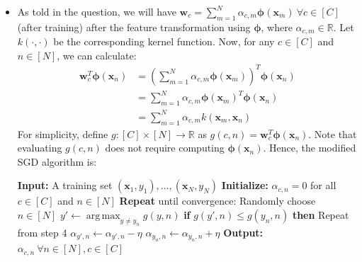 \documentclass{article}
\newcommand{\mbi}[1]{\boldsymbol{#1}}
\newcommand{\IndentState}{\State \hspace{1em}}
\DeclareMathOperator*{\argmax}{arg\,max}
\begin{document}
\begin{itemize}
    \item[\textbf{1.3}] As told in the question, we will have $\mbi{w}_c = \sum_{m=1}^N \alpha_{c,m} \mbi{\phi}(\mbi{x}_m) ~ \forall c \in [C]$ (after training) after the feature transformation using $\mbi{\phi}$, where $\alpha_{c,m} \in \mathbb{R}$.
    Let $k(\cdot, \cdot)$ be the corresponding kernel function.
    Now, for any $c \in [C]$ and $n \in [N]$, we can calculate:
    \begin{align*}
      \mbi{w}_c^T \mbi{\phi}(\mbi{x}_n) &= \left( \sum_{m=1}^N \alpha_{c,m} \mbi{\phi}(\mbi{x}_m) \right)^T \mbi{\phi}(\mbi{x}_n) \\
      &= \sum_{m=1}^N \alpha_{c,m} \mbi{\phi}(\mbi{x}_m)^T \mbi{\phi}(\mbi{x}_n) \\
      &= \sum_{m=1}^N \alpha_{c,m} k(\mbi{x}_m, \mbi{x}_n)
    \end{align*}
    For simplicity, define $g: [C] \times [N] \to \mathbb{R}$ as $g(c, n) = \mbi{w}_c^T \mbi{\phi}(\mbi{x}_n)$.
    Note that evaluating $g(c, n)$ does not require computing $\mbi{\phi}(\mbi{x}_n)$.
    Hence, the modified SGD algorithm is:
    \begin{algorithm}
      \caption{Multiclass Perceptron with kernel function $k(\cdot, \cdot)$}
      \begin{algorithmic}[1]
        \State \textbf{Input:} A training set $(\mbi{x}_1, y_1), \dots, (\mbi{x}_N, y_N)$
        \State \textbf{Initialize:} $\alpha_{c,n} = 0$ for all $c \in [C]$ and $n \in [N]$
        \State \textbf{Repeat} until convergence:
        \IndentState Randomly choose $n \in [N]$
        \IndentState $y' \gets \argmax_{y \ne y_n} g(y, n)$
        \IndentState \textbf{if} $g(y', n) \le g(y_n, n)$ \textbf{then} Repeat from step 4
        \IndentState $\alpha_{y', n} \gets \alpha_{y', n} - \eta$
        \IndentState $\alpha_{y_n, n} \gets \alpha_{y_n, n} + \eta$
        \State \textbf{Output:} $\alpha_{c,n} ~ \forall n \in [N], c \in [C]$
      \end{algorithmic}
      
    \end{algorithm}
  \end{itemize}
  
\end{document}

